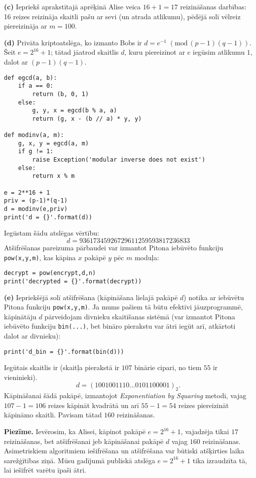 \documentclass[11pt]{article}
\begin{document}
{\bf (c)} Iepriekš aprakstītajā aprēķinā Alise veica $16+1 = 17$ reizināšanas darbības:
16 reizes reizināja skaitli pašu ar sevi (un atrada atlikumu), pēdējā solī vēlreiz
piereizināja ar $m=100$.

{\bf (d)} Privāta kriptoatslēga, ko izmanto Bobs ir $d = e^{-1}\;(\text{mod}\,(p-1)(q-1))$.
Šeit $e = 2^{16} + 1$; tātad jāatrod skaitlis $d$, kuru piereizinot ar $e$ iegūsim atlikumu $1$,
dalot ar $(p-1)(q-1)$.
\begin{verbatim}
def egcd(a, b):
    if a == 0:
        return (b, 0, 1)
    else:
        g, y, x = egcd(b % a, a)
        return (g, x - (b // a) * y, y)

def modinv(a, m):
    g, x, y = egcd(a, m)
    if g != 1:
        raise Exception('modular inverse does not exist')
    else:
        return x % m

e = 2**16 + 1
priv = (p-1)*(q-1)
d = modinv(e,priv)
print('d = {}'.format(d))
\end{verbatim}
Iegūstam šādu atslēgas vērtību:
$$d = 93617345926729611259593817236833$$
Atšifrēšanas pareizuma pārbaudei var izmantot Pitona iebūvēto funkciju {\tt pow(x,y,m)}, kas
kāpina $x$ pakāpē $y$ pēc $m$ moduļa:
\begin{verbatim}
decrypt = pow(encrypt,d,n)
print('decrypted = {}'.format(decrypt))
\end{verbatim}


{\bf (e)} Iepriekšējā solī atšifrēšana (kāpināšana lielajā pakāpē $d$)
notika ar iebūvētu Pitona funkciju {\tt pow(x,y,m)}. Ja mums pašiem tā
būtu efektīvi jāuzprogrammē,
kāpinātāju $d$ pārveidojam divnieku skaitīšanas sistēmā (var izmantot Pitona
iebūvēto funkciju {\tt bin(...)}, bet bināro pierakstu var ātri iegūt arī, atkārtoti dalot ar divnieku):
\begin{verbatim}
print('d_bin = {}'.format(bin(d)))
\end{verbatim}
Iegūtais skaitlis ir (skaitļa pierakstā ir $107$ binārie cipari, no tiem $55$ ir vieninieki).
$$d = (1001001110\ldots{}0101100001)_2.$$
Kāpināšanai šādā pakāpē, izmantojot {\em Exponentiation by Squaring} metodi,
vajag $107-1 = 106$ reizes kāpināt kvadrātā un arī $55-1 = 54$ reizes
piereizināt kāpināmo skaitli. Pavisam tātad $160$ reizināšanas.

{\bf Piezīme.} Ievērosim, ka Alisei, kāpinot pakāpē $e = 2^{16}+1$, vajadzēja tikai $17$
reizināšanas, bet atšifrēšanai jeb kāpināšanai pakāpē $d$ vajag $160$ reizināšanas.
Asimetriskiem algoritmiem 
iešifrēšana un atšifrēšana var būtiski atšķirties laika sarežģītības ziņā. Mūsu gadījumā
publiskā atslēga $e = 2^{16}+1$ tika
izraudzīta tā, lai iešifrēt varētu īpaši ātri.
\end{document}

